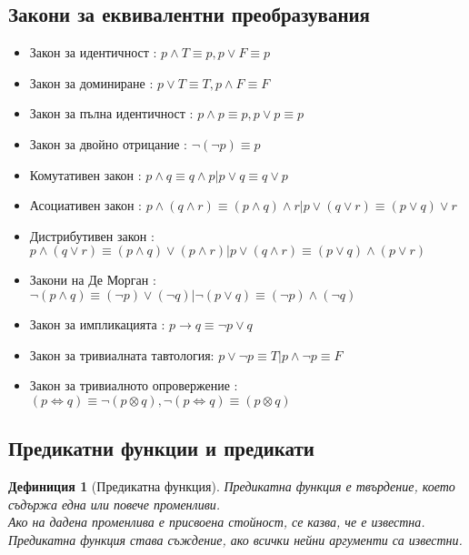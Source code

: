 \documentclass[fleqn, 12pt]{article}
\newtheorem{definition}{Дефиниция}[subsection]
\begin{document}
\newpage

\subsection{Закони за еквивалентни преобразувания}

\begin{itemize}
	\item Закон за идентичност : $p \land T \equiv p , p \lor F \equiv p$
	\item Закон за доминиране : $p \lor T \equiv T , p \land F \equiv F$
	\item Закон за пълна идентичност : $p \land p \equiv p , p \lor p \equiv p$
	\item Закон за двойно отрицание : $\neg(\neg p) \equiv p $
	\item Комутативен закон : $p \land q \equiv q \land p | p \lor q \equiv q \lor p$
	\item Асоциативен закон : $p \land (q \land r) \equiv (p \land q ) \land r | p \lor (q \lor r) \equiv (p \lor q ) \lor r$
	\item Дистрибутивен закон : $p \land (q \lor r) \equiv (p \land q ) \lor (p \land r ) | p \lor (q \land r) \equiv (p \lor q ) \land (p \lor r )  $
	\item Закони на Де Морган : $\neg (p \land q) \equiv (\neg p) \lor (\neg q) | \neg (p \lor q) \equiv (\neg p) \land (\neg q) $
	\item Закон за импликацията : $p \rightarrow q \equiv \neg p \lor q$
	\item Закон за тривиалната тавтология:  $p \lor \neg p \equiv T | p \land \neg p \equiv F$
	\item Закон за тривиалното опровержение : $(p \Leftrightarrow q) \equiv \neg (p \otimes q), \neg (p \Leftrightarrow q) \equiv (p \otimes q) $
\end{itemize}

\subsection{Предикатни функции и предикати}

\begin{definition}[Предикатна функция]
Предикатна функция е твърдение, което съдържа една или повече променливи. \\
Ако на дадена променлива е присвоена стойност, се казва, че е известна.\\
Предикатна функция става съждение, ако всички нейни аргументи са известни. \\
\end{definition}
\end{document}
